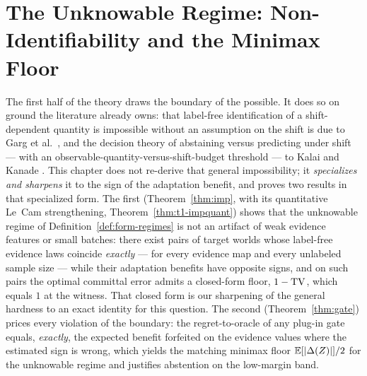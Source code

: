 
\chapter{The Unknowable Regime: Non-Identifiability and the Minimax Floor}\label{ch:theory1}

The first half of the theory draws the boundary of the possible. It does so on
ground the literature already owns: that label-free identification of a
shift-dependent quantity is impossible without an assumption on the shift is due to
Garg et al.\ \cite{garg2022atc}, and the decision theory of abstaining versus
predicting under shift --- with an observable-quantity-versus-shift-budget threshold
--- to Kalai and Kanade \cite{kalai2021abstain}. This chapter does not re-derive
that general impossibility; it \emph{specializes and sharpens} it to the sign of the
adaptation benefit, and proves two results in that specialized form. The first
(Theorem~\ref{thm:imp}, with its quantitative Le~Cam strengthening,
Theorem~\ref{thm:t1-impquant}) shows that the unknowable regime of
Definition~\ref{def:form-regimes} is not an artifact of weak evidence
features or small batches: there exist pairs of target worlds whose
label-free evidence laws coincide \emph{exactly} --- for every evidence map
and every unlabeled sample size --- while their adaptation benefits have
opposite signs, and on such pairs the optimal committal error admits a
closed-form floor, $1-\mathrm{TV}$, which equals $1$ at the witness. That closed form is our
sharpening of the general hardness to an exact identity for this question. The
second (Theorem~\ref{thm:gate}) prices every violation of the boundary: the
regret-to-oracle of any plug-in gate equals, \emph{exactly}, the expected
benefit forfeited on the evidence values where the estimated sign is wrong,
which yields the matching minimax floor $\mathbb{E}[|\Delta(Z)|]/2$ for the
unknowable regime and justifies abstention on the low-margin band.

